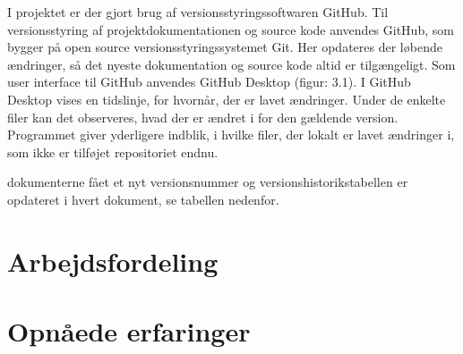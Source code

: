 I projektet er der gjort brug af versionsstyringssoftwaren GitHub. 
Til versionsstyring af projektdokumentationen og source kode anvendes GitHub, som
bygger på open source versionsstyringssystemet Git. Her opdateres der løbende ændringer,
så det nyeste dokumentation og source kode altid er tilgængeligt. Som user interface til
GitHub anvendes GitHub Desktop (figur: 3.1). I GitHub Desktop vises en tidslinje, for
hvornår, der er lavet ændringer. Under de enkelte filer kan det observeres, hvad der er
ændret i for den gældende version. Programmet giver yderligere indblik, i hvilke filer, der
lokalt er lavet ændringer i, som ikke er tilføjet repositoriet endnu.

dokumenterne fået et nyt versionsnummer og versionshistorikstabellen er opdateret i hvert
dokument, se tabellen nedenfor.
\section{Arbejdsfordeling}

\section{Opnåede erfaringer}
 